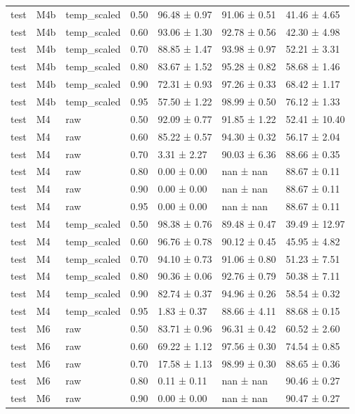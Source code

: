 \begin{tabular}{lllrlll}
test & M4b & temp\_scaled & 0.50 & 96.48 ± 0.97 & 91.06 ± 0.51 & 41.46 ± 4.65 \\
test & M4b & temp\_scaled & 0.60 & 93.06 ± 1.30 & 92.78 ± 0.56 & 42.30 ± 4.98 \\
test & M4b & temp\_scaled & 0.70 & 88.85 ± 1.47 & 93.98 ± 0.97 & 52.21 ± 3.31 \\
test & M4b & temp\_scaled & 0.80 & 83.67 ± 1.52 & 95.28 ± 0.82 & 58.68 ± 1.46 \\
test & M4b & temp\_scaled & 0.90 & 72.31 ± 0.93 & 97.26 ± 0.33 & 68.42 ± 1.17 \\
test & M4b & temp\_scaled & 0.95 & 57.50 ± 1.22 & 98.99 ± 0.50 & 76.12 ± 1.33 \\
test & M4 & raw & 0.50 & 92.09 ± 0.77 & 91.85 ± 1.22 & 52.41 ± 10.40 \\
test & M4 & raw & 0.60 & 85.22 ± 0.57 & 94.30 ± 0.32 & 56.17 ± 2.04 \\
test & M4 & raw & 0.70 & 3.31 ± 2.27 & 90.03 ± 6.36 & 88.66 ± 0.35 \\
test & M4 & raw & 0.80 & 0.00 ± 0.00 & nan ± nan & 88.67 ± 0.11 \\
test & M4 & raw & 0.90 & 0.00 ± 0.00 & nan ± nan & 88.67 ± 0.11 \\
test & M4 & raw & 0.95 & 0.00 ± 0.00 & nan ± nan & 88.67 ± 0.11 \\
test & M4 & temp\_scaled & 0.50 & 98.38 ± 0.76 & 89.48 ± 0.47 & 39.49 ± 12.97 \\
test & M4 & temp\_scaled & 0.60 & 96.76 ± 0.78 & 90.12 ± 0.45 & 45.95 ± 4.82 \\
test & M4 & temp\_scaled & 0.70 & 94.10 ± 0.73 & 91.06 ± 0.80 & 51.23 ± 7.51 \\
test & M4 & temp\_scaled & 0.80 & 90.36 ± 0.06 & 92.76 ± 0.79 & 50.38 ± 7.11 \\
test & M4 & temp\_scaled & 0.90 & 82.74 ± 0.37 & 94.96 ± 0.26 & 58.54 ± 0.32 \\
test & M4 & temp\_scaled & 0.95 & 1.83 ± 0.37 & 88.66 ± 4.11 & 88.68 ± 0.15 \\
test & M6 & raw & 0.50 & 83.71 ± 0.96 & 96.31 ± 0.42 & 60.52 ± 2.60 \\
test & M6 & raw & 0.60 & 69.22 ± 1.12 & 97.56 ± 0.30 & 74.54 ± 0.85 \\
test & M6 & raw & 0.70 & 17.58 ± 1.13 & 98.99 ± 0.30 & 88.65 ± 0.36 \\
test & M6 & raw & 0.80 & 0.11 ± 0.11 & nan ± nan & 90.46 ± 0.27 \\
test & M6 & raw & 0.90 & 0.00 ± 0.00 & nan ± nan & 90.47 ± 0.27 \\

\end{tabular}
